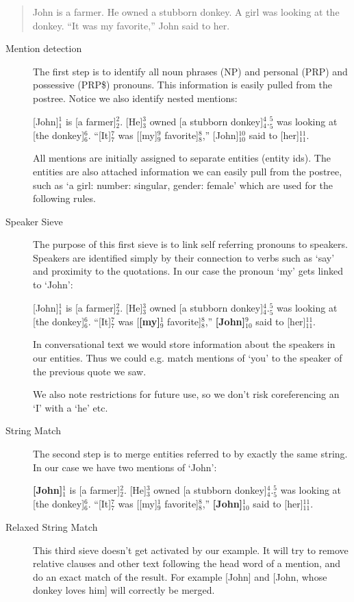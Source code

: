 \documentclass[12pt]{article}
\begin{document}
\begin{quotation}
John is a farmer. He owned a stubborn donkey.
A girl was looking at the donkey.
``It was my favorite,'' John said to her.
\end{quotation}

\begin{description}
\item[Mention detection]
The first step is to identify all noun phrases (NP) and personal (PRP) and possessive (PRP\$) pronouns. This information is easily pulled from the postree. Notice we also identify nested mentions:

[John]$_1^1$ is [a farmer]$_2^2$. [He]$_3^3$ owned [a stubborn donkey]$_4^4$.\newline
[A girl]$_5^5$ was looking at [the donkey]$_6^6$.\newline
``[It]$_7^7$ was [[my]$_9^9$ favorite]$_8^8$,'' [John]$_{10}^{10}$ said to [her]$_{11}^{11}$.

All mentions are initially assigned to separate entities (entity ids). The entities are also attached information we can easily pull from the postree, such as `a girl: {number: singular, gender: female}' which are used for the following rules.
\item[Speaker Sieve]
The purpose of this first sieve is to link self referring pronouns to speakers. Speakers are identified simply by their connection to verbs such as `say' and proximity to the quotations. In our case the pronoun `my' gets linked to `John':

[John]$_1^1$ is [a farmer]$_2^2$. [He]$_3^3$ owned [a stubborn donkey]$_4^4$.\newline
[A girl]$_5^5$ was looking at [the donkey]$_6^6$.\newline
``[It]$_7^7$ was [\textbf{[my]$_9^1$} favorite]$_8^8$,'' \textbf{[John]$_{10}^{9}$} said to [her]$_{11}^{11}$.

In conversational text we would store information about the speakers in our entities. Thus we could e.g. match mentions of `you' to the speaker of the previous quote we saw.

We also note restrictions for future use, so we don't risk coreferencing an `I' with a `he' etc.
\item[String Match]
The second step is to merge entities referred to by exactly the same string. In our case we have two mentions of `John':

\textbf{[John]$_1^1$} is [a farmer]$_2^2$. [He]$_3^3$ owned [a stubborn donkey]$_4^4$.\newline
[A girl]$_5^5$ was looking at [the donkey]$_6^6$.\newline
``[It]$_7^7$ was [[my]$_9^1$ favorite]$_8^8$,'' \textbf{[John]$_{10}^{1}$} said to [her]$_{11}^{11}$.
\item[Relaxed String Match]
This third sieve doesn't get activated by our example. It will try to remove relative clauses and other text following the head word of a mention, and do an exact match of the result. For example [John] and [John, whose donkey loves him] will correctly be merged.


\end{description}
\end{document}
